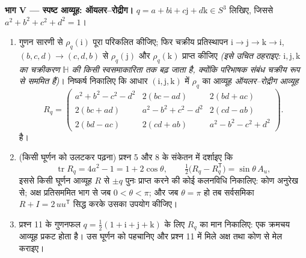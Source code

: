 \begin{problem}
\medskip
\noindent\textbf{भाग V --- स्पष्ट आव्यूह: ऑयलर--रोद्रीग।} $q = a + b\mathrm i + c\mathrm j +
d\mathrm k \in S^3$
लिखिए, जिससे $a^2 + b^2 + c^2 + d^2 = 1$।
\begin{enumerate}[resume]
  \item गुणन सारणी से $\rho_q(\mathrm i)$ पूरा परिकलित कीजिए; फिर चक्रीय
        प्रतिस्थापन $\mathrm i \to \mathrm j \to \mathrm k
        \to \mathrm i$, $(b, c, d) \to (c, d, b)$ से $\rho_q(\mathrm
        j)$ और $\rho_q(\mathrm k)$ प्राप्त कीजिए
        \emph{(इसे उचित ठहराइए: $\mathrm i, \mathrm j,
        \mathrm k$ का चक्रीकरण $\mathbb
        H$ की किसी
        स्वसमाकारिता तक बढ़ जाता है, क्योंकि परिभाषक संबंध चक्रीय
        रूप से सममित हैं)}। निष्कर्ष निकालिए कि आधार $(\mathrm i, \mathrm j, \mathrm k)$ में
        $\rho_q$ का आव्यूह \emph{ऑयलर--रोद्रीग आव्यूह}
        \[
        R_q = \begin{pmatrix}
        a^2 + b^2 - c^2 - d^2 & 2(bc - ad) & 2(bd + ac)\\
        2(bc + ad) & a^2 - b^2 + c^2 - d^2 & 2(cd - ab)\\
        2(bd - ac) & 2(cd + ab) & a^2 - b^2 - c^2 + d^2
        \end{pmatrix}.
        \]
        है।
  \item (किसी घूर्णन को उलटकर पढ़ना) प्रश्न 5 और 8 के संकेतन में
        दर्शाइए कि
        \[
        \operatorname{tr}R_q = 4a^2 - 1 = 1 + 2\cos\theta,
        \qquad
        \tfrac12\bigl(R_q - R_q^{\mathsf T}\bigr) =
        \sin\theta\,A_u,
        \]
        इससे किसी घूर्णन आव्यूह $R$ से $\pm q$ पुनः प्राप्त करने
        की कोई कलनविधि निकालिए: कोण अनुरेख से; अक्ष प्रतिसममित
        भाग से जब $0 < \theta < \pi$; और जब $\theta = \pi$ हो तब सर्वसमिका $R
        + I = 2\,uu^{\mathsf T}$ सिद्ध
        करके उसका उपयोग कीजिए।
  \item प्रश्न 11 के गुणनफल $q =
        \frac12(1 + \mathrm i + \mathrm j + \mathrm k)$ के लिए $R_q$ का मान निकालिए: एक
        क्रमचय आव्यूह प्रकट होता है। उस घूर्णन को पहचानिए और
        प्रश्न 11 में मिले अक्ष तथा कोण से मेल कराइए।
\end{enumerate}


\end{problem}

